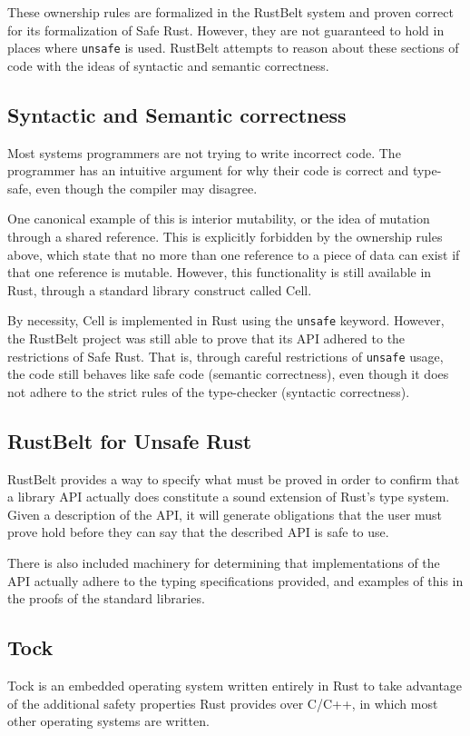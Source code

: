 \documentclass[12pt]{article}
\begin{document}
These ownership rules are formalized in the RustBelt system and proven correct for its formalization of Safe Rust. However, they are not guaranteed to hold in places where \texttt{unsafe} is used. RustBelt attempts to reason about these sections of code with the ideas of syntactic and semantic correctness.

\subsection{Syntactic and Semantic correctness}
Most systems programmers are not trying to write incorrect code. The programmer has an intuitive argument for why their code is correct and type-safe, even though the compiler may disagree.

One canonical example of this is interior mutability, or the idea of mutation through a shared reference. This is explicitly forbidden by the ownership rules above, which state that no more than one reference to a piece of data can exist if that one reference is mutable. However, this functionality is still available in Rust, through a standard library construct called Cell.

By necessity, Cell is implemented in Rust using the \texttt{unsafe} keyword. However, the RustBelt project was still able to prove that its API adhered to the restrictions of Safe Rust. That is, through careful restrictions of \texttt{unsafe} usage, the code still behaves like safe code (semantic correctness), even though it does not adhere to the strict rules of the type-checker (syntactic correctness).

\subsection{RustBelt for Unsafe Rust}
RustBelt provides a way to specify what must be proved in order to confirm that a library API actually does constitute a sound extension of Rust's type system. Given a description of the API, it will generate obligations that the user must prove hold before they can say that the described API is safe to use.

There is also included machinery for determining that implementations of the API actually adhere to the typing specifications provided, and examples of this in the proofs of the standard libraries.

\subsection{Tock}
Tock is an embedded operating system written entirely in Rust to take advantage of the additional safety properties Rust provides over C/C++, in which most other operating systems are written.
\end{document}
